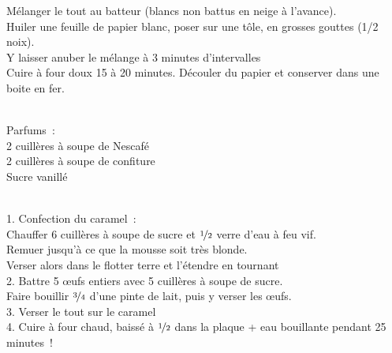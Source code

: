 \begin{minipage}[c]{\textwidth}
Mélanger le tout au batteur (blancs non battus en neige à l’avance).\\
Huiler une feuille de papier blanc, poser sur une tôle, en grosses gouttes (1/2 noix). \\
Y laisser anuber le mélange à 3 minutes d’intervalles\\
Cuire à four doux 15 à 20 minutes. Découler du papier et conserver dans une boite en fer.\\
\\

\end{minipage}

\begin{minipage}[c]{\textwidth}
Parfums : \\
2 cuillères à soupe de Nescafé \\
2 cuillères à soupe de confiture\\
Sucre vanillé\\
\\

\end{minipage}

\begin{minipage}[c]{\textwidth}
1. Confection du caramel :\\
Chauffer 6 cuillères à soupe de sucre et $\nicefrac{1}{2}$ verre d’eau à feu vif. \\
Remuer jusqu’à ce que la mousse soit très blonde. \\
Verser alors dans le flotter terre et l’étendre en tournant\\
2. Battre 5 œufs entiers avec 5 cuillères à soupe de sucre. \\
Faire bouillir $\nicefrac{3}{4}$ d’une pinte de lait, puis y verser les œufs.\\
3. Verser le tout sur le caramel\\
4. Cuire à four chaud, baissé à $\nicefrac{1}{2}$ dans la plaque + eau bouillante pendant 25 minutes !\\
\\

\end{minipage}

